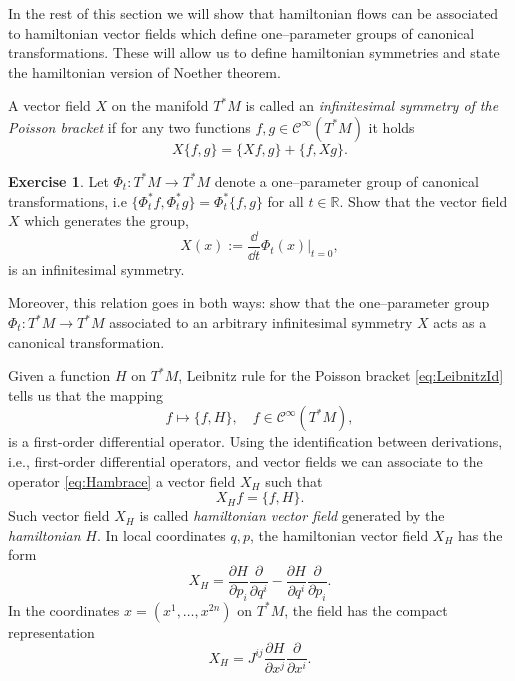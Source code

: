 \documentclass[english,fontsize=11pt,paper=b5]{scrbook}
\theoremstyle{definition}
\newtheorem{exercise}{Exercise}[chapter]
\begin{document}
    In the rest of this section we will show that hamiltonian flows can be associated to hamiltonian vector fields which define one--parameter groups of canonical transformations. These will allow us to define hamiltonian symmetries and state the hamiltonian version of Noether theorem.

    \begin{tcolorbox}
      A vector field $X$ on the manifold $T^* M$ is called an \emph{infinitesimal symmetry of the Poisson bracket} if for any two functions $f,g \in \mathcal{C}^\infty(T^*M)$ it holds
      \begin{equation}\label{eq:infsymm}
        X\big\{f,g\big\} = \big\{X f, g\big\} + \big\{f, X g\big\}.
      \end{equation}
    \end{tcolorbox}

    \begin{exercise}\label{exe:haminfsym}
      Let $\Phi_t:T^*M \to T^*M$ denote a one--parameter group of canonical transformations, i.e $\big\{\Phi_t^* f, \Phi_t^* g\big\} = \Phi_t^*\big\{f,g\big\}$ for all $t\in\mathbb{R}$.
      Show that the vector field $X$ which generates the group,
      \begin{equation}
        X(x) := \frac{\dd }{\dd t}\Phi_t(x)\Big|_{t=0},
      \end{equation}
      is an infinitesimal symmetry.

      Moreover, this relation goes in both ways: show that the one--parameter group $\Phi_t:T^*M \to T^*M$ associated to an  arbitrary infinitesimal symmetry $X$ acts as a canonical transformation.
    \end{exercise}

    Given a function $H$ on $T^* M$, Leibnitz rule for the Poisson bracket \eqref{eq:LeibnitzId} tells us that the mapping
    \begin{equation}\label{eq:Hambrace}
      f \mapsto \big\{f,H\big\}, \quad f\in\mathcal{C}^\infty(T^*M),
    \end{equation}
    is a first-order differential operator.
    Using the identification between derivations, i.e., first-order differential operators, and vector fields we can associate to the operator \eqref{eq:Hambrace} a vector field $X_H$ such that
    \begin{equation}
      X_H f = \big\{f, H\big\}.
    \end{equation}
    Such vector field $X_H$ is called \emph{hamiltonian vector field} generated by the \emph{hamiltonian} $H$.
    In local coordinates $q,p$, the hamiltonian vector field $X_H$ has the form
    \begin{equation}
      X_H = \frac{\partial H}{\partial p_i} \frac{\partial}{\partial q^i} - \frac{\partial H}{\partial q^i}\frac{\partial}{\partial p_i}.
    \end{equation}
    In the coordinates $x = (x^1, \ldots, x^{2n})$ on $T^*M$, the field has the compact representation
    \begin{equation}
      X_H = J^{ij}\frac{\partial H}{\partial x^j}\frac{\partial}{\partial x^i}.
    \end{equation}
\end{document}
